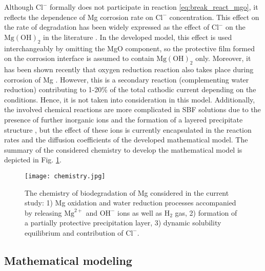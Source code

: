 Although $\mathrm{Cl}^{-}$ formally does not participate in reaction \ref{eq:break_react_mgo}, it reflects the dependence of Mg corrosion rate on $\mathrm{Cl}^{-}$ concentration. This effect on the rate of degradation has been widely expressed as the effect of $\mathrm{Cl}^{-}$ on the $\mathrm{Mg}(\mathrm{OH})_{2}$ in the literature \cite{Zheng2014,Zhao2017}. In the developed model, this effect is used interchangeably by omitting the MgO component, so the protective film formed on the corrosion interface is assumed to contain $\mathrm{Mg}(\mathrm{OH})_{2}$ only. Moreover, it has been shown recently that oxygen reduction reaction also takes place during corrosion of Mg \cite{Wang2020,Strebl2020,Silva2018}. However, this is a secondary reaction (complementing water reduction) contributing to 1-20\% of the total cathodic current depending on the conditions. Hence, it is not taken into consideration in this model.  Additionally, the involved chemical reactions are more complicated in \gls{SBF} solutions due to the presence of further inorganic ions and the formation of a layered precipitate structure  \cite{Mei2020}, but the effect of these ions is currently encapsulated in the reaction rates and the diffusion  coefficients of the developed mathematical model. The summary of the considered chemistry to develop the mathematical model is depicted in Fig. \ref{fig:chemistry}.


\begin{figure}[h]
\centering
\medskip
\texttt{[image: chemistry.jpg]}
\caption[Simplified chemistry of biodegradation of Mg]{The chemistry of biodegradation of Mg considered in the current study: 1) Mg oxidation and water reduction processes accompanied by releasing $\mathrm{Mg}^{2+}$ and $\mathrm{OH}^{-}$  ions as well as $\mathrm{H}_2$ gas, 2) formation of a partially protective precipitation layer, 3) dynamic solubility equilibrium and contribution of $\mathrm{Cl}^{-}$.} \label{fig:chemistry}
\end{figure}


\subsection{Mathematical modeling}

